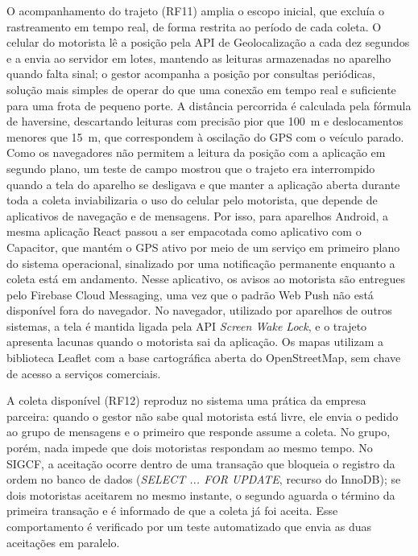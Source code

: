 O acompanhamento do trajeto (RF11) amplia o escopo inicial, que excluía o rastreamento em tempo real, de forma restrita ao período de cada coleta. O celular do motorista lê a posição pela API de Geolocalização a cada dez segundos e a envia ao servidor em lotes, mantendo as leituras armazenadas no aparelho quando falta sinal; o gestor acompanha a posição por consultas periódicas, solução mais simples de operar do que uma conexão em tempo real e suficiente para uma frota de pequeno porte. A distância percorrida é calculada pela fórmula de haversine, descartando leituras com precisão pior que 100~m e deslocamentos menores que 15~m, que correspondem à oscilação do GPS com o veículo parado. Como os navegadores não permitem a leitura da posição com a aplicação em segundo plano, um teste de campo mostrou que o trajeto era interrompido quando a tela do aparelho se desligava e que manter a aplicação aberta durante toda a coleta inviabilizaria o uso do celular pelo motorista, que depende de aplicativos de navegação e de mensagens. Por isso, para aparelhos Android, a mesma aplicação React passou a ser empacotada como aplicativo com o Capacitor, que mantém o GPS ativo por meio de um serviço em primeiro plano do sistema operacional, sinalizado por uma notificação permanente enquanto a coleta está em andamento. Nesse aplicativo, os avisos ao motorista são entregues pelo Firebase Cloud Messaging, uma vez que o padrão Web Push não está disponível fora do navegador. No navegador, utilizado por aparelhos de outros sistemas, a tela é mantida ligada pela API \textit{Screen Wake Lock}, e o trajeto apresenta lacunas quando o motorista sai da aplicação. Os mapas utilizam a biblioteca Leaflet com a base cartográfica aberta do OpenStreetMap, sem chave de acesso a serviços comerciais.

A coleta disponível (RF12) reproduz no sistema uma prática da empresa parceira: quando o gestor não sabe qual motorista está livre, ele envia o pedido ao grupo de mensagens e o primeiro que responde assume a coleta. No grupo, porém, nada impede que dois motoristas respondam ao mesmo tempo. No SIGCF, a aceitação ocorre dentro de uma transação que bloqueia o registro da ordem no banco de dados (\textit{SELECT ... FOR UPDATE}, recurso do InnoDB); se dois motoristas aceitarem no mesmo instante, o segundo aguarda o término da primeira transação e é informado de que a coleta já foi aceita. Esse comportamento é verificado por um teste automatizado que envia as duas aceitações em paralelo.


